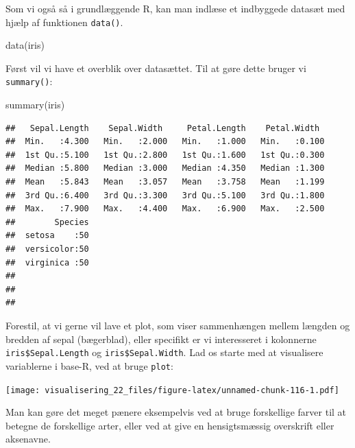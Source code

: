 \documentclass[
]{book}
\newenvironment{Shaded}{\begin{snugshade}}{\end{snugshade}}
\newcommand{\FunctionTok}[1]{\textcolor[rgb]{0.00,0.00,0.00}{#1}}
\newcommand{\NormalTok}[1]{#1}
\newcommand{\SpecialCharTok}[1]{\textcolor[rgb]{0.00,0.00,0.00}{#1}}
\begin{document}
Som vi også så i grundlæggende R, kan man indlæse et indbyggede datasæt med hjælp af funktionen \texttt{data()}.

\begin{Shaded}
\begin{Highlighting}[]
\FunctionTok{data}\NormalTok{(iris)}
\end{Highlighting}
\end{Shaded}

Først vil vi have et overblik over datasættet. Til at gøre dette bruger vi \texttt{summary()}:

\begin{Shaded}
\begin{Highlighting}[]
\FunctionTok{summary}\NormalTok{(iris)}
\end{Highlighting}
\end{Shaded}

\begin{verbatim}
##   Sepal.Length    Sepal.Width     Petal.Length    Petal.Width   
##  Min.   :4.300   Min.   :2.000   Min.   :1.000   Min.   :0.100  
##  1st Qu.:5.100   1st Qu.:2.800   1st Qu.:1.600   1st Qu.:0.300  
##  Median :5.800   Median :3.000   Median :4.350   Median :1.300  
##  Mean   :5.843   Mean   :3.057   Mean   :3.758   Mean   :1.199  
##  3rd Qu.:6.400   3rd Qu.:3.300   3rd Qu.:5.100   3rd Qu.:1.800  
##  Max.   :7.900   Max.   :4.400   Max.   :6.900   Max.   :2.500  
##        Species  
##  setosa    :50  
##  versicolor:50  
##  virginica :50  
##                 
##                 
## 
\end{verbatim}

Forestil, at vi gerne vil lave et plot, som viser sammenhængen mellem længden og bredden af sepal (bægerblad), eller specifikt er vi interesseret i kolonnerne \texttt{iris\$Sepal.Length} og \texttt{iris\$Sepal.Width}. Lad os starte med at visualisere variablerne i base-R, ved at bruge \texttt{plot}:

\begin{Shaded}
\end{Shaded}

\texttt{[image: visualisering\_22\_files/figure-latex/unnamed-chunk-116-1.pdf]}

Man kan gøre det meget pænere eksempelvis ved at bruge forskellige farver til at betegne de forskellige arter, eller ved at give en hensigtsmæssig overskrift eller aksenavne.
\end{document}
